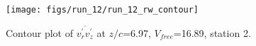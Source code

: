 \begin{figure}[H]
\centering
\texttt{[image: figs/run\_12/run\_12\_rw\_contour]}
\caption{Contour plot of $\overline{v_{r}^{\prime} v_{z}^{\prime}}$ at $z/c$=6.97, $V_{free}$=16.89, station 2.}
\label{fig:run_12_rw_contour}
\end{figure}


